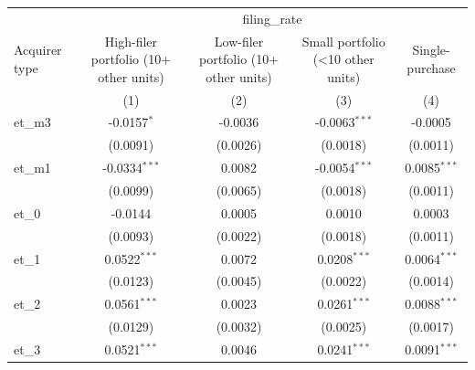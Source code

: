 
\begingroup
\centering
\begin{tabular}{lcccc}
   \toprule
    & \multicolumn{4}{c}{filing\_rate}\\
   Acquirer type      & High-filer portfolio (10+ other units) & Low-filer portfolio (10+ other units) & Small portfolio (<10 other units) & Single-purchase \\   
                      & (1)                                    & (2)                                   & (3)                               & (4)\\  
   \midrule 
   et\_m3             & -0.0157$^{*}$                          & -0.0036                               & -0.0063$^{***}$                   & -0.0005\\   
                      & (0.0091)                               & (0.0026)                              & (0.0018)                          & (0.0011)\\   
   et\_m1             & -0.0334$^{***}$                        & 0.0082                                & -0.0054$^{***}$                   & 0.0085$^{***}$\\   
                      & (0.0099)                               & (0.0065)                              & (0.0018)                          & (0.0011)\\   
   et\_0              & -0.0144                                & 0.0005                                & 0.0010                            & 0.0003\\   
                      & (0.0093)                               & (0.0022)                              & (0.0018)                          & (0.0011)\\   
   et\_1              & 0.0522$^{***}$                         & 0.0072                                & 0.0208$^{***}$                    & 0.0064$^{***}$\\   
                      & (0.0123)                               & (0.0045)                              & (0.0022)                          & (0.0014)\\   
   et\_2              & 0.0561$^{***}$                         & 0.0023                                & 0.0261$^{***}$                    & 0.0088$^{***}$\\   
                      & (0.0129)                               & (0.0032)                              & (0.0025)                          & (0.0017)\\   
   et\_3              & 0.0521$^{***}$                         & 0.0046                                & 0.0241$^{***}$                    & 0.0091$^{***}$\\   

\end{tabular}
